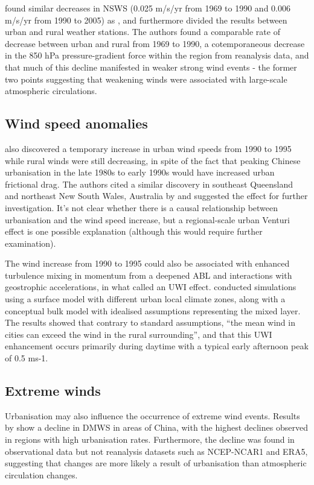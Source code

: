 \citet{guo2011} found similar decreases in \ac{NSWS} (0.025 m/s/yr from 1969 to 1990 and 0.006 m/s/yr from 1990 to 2005) as \citet{li2008}, and furthermore divided the results between urban and rural weather stations. The authors found a comparable rate of decrease between urban and rural from 1969 to 1990, a cotemporaneous decrease in the 850 hPa pressure-gradient force within the region from reanalysis data, and that much of this decline manifested in weaker strong wind events - the former two points suggesting that weakening winds were associated with large-scale atmospheric circulations.

\subsection{Wind speed anomalies}

\citet{guo2011} also discovered a temporary increase in urban wind speeds from 1990 to 1995 while rural winds were still decreasing, in spite of the fact that peaking Chinese urbanisation in the late 1980s to early 1990s would have increased urban frictional drag. The authors cited a similar discovery in southeast Queensland and northeast New South Wales, Australia by \citet{mcvicar2008} and suggested the effect for further investigation. It’s not clear whether there is a causal relationship between urbanisation and the wind speed increase, but a regional-scale urban Venturi effect is one possible explanation (although this would require further examination).

The wind increase from 1990 to 1995 could also be associated with enhanced turbulence mixing in momentum from a deepened \ac{ABL} and interactions with geostrophic accelerations, in what \citet{droste2018} called an \acf{UWI} effect. \citet{droste2018} conducted simulations using a surface model with different urban local climate zones, along with a conceptual bulk model with idealised assumptions representing the mixed layer. The results showed that contrary to standard assumptions, “the mean wind in cities can exceed the wind in the rural surrounding”, and that this \ac{UWI} enhancement occurs primarily during daytime with a typical early afternoon peak of 0.5 ms-1.

\subsection{Extreme winds}

Urbanisation may also influence the occurrence of extreme wind events. Results by \citet{zhang2020, zhang2022} show a decline in \ac{DMWS} in areas of China, with the highest declines observed in regions with high urbanisation rates. Furthermore, the decline was found in observational data but not reanalysis datasets such as NCEP-NCAR1 and \ac{ERA5}, suggesting that changes are more likely a result of urbanisation than atmospheric circulation changes.

